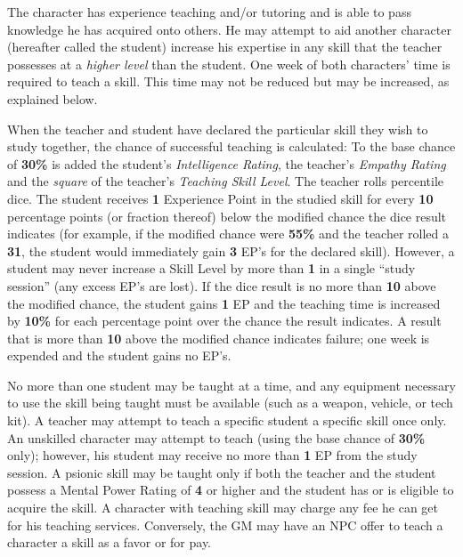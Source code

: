 \label{sec:skill-teaching}

The character has experience teaching and/or tutoring and is able to
pass knowledge he has acquired onto others.  He may attempt to aid
another character (hereafter called the student) increase his
expertise in any skill that the teacher possesses at a \emph{higher level}
than the student.  One week of both characters' time is required to
teach a skill.  This time may not be reduced but may be increased, as
explained below.

When the teacher and student have declared the particular skill they
wish to study together, the chance of successful teaching is
calculated: To the base chance of \textbf{30\%} is added the student's
\emph{Intelligence Rating}, the teacher's \emph{Empathy Rating} and
the \emph{square} of the teacher's \emph{Teaching Skill Level}.  The
teacher rolls percentile dice.  The student receives \textbf{1}
Experience Point in the studied skill for every \textbf{10} percentage
points (or fraction thereof) below the modified chance the dice result
indicates (for example, if the modified chance were \textbf{55\%} and
the teacher rolled a \textbf{31}, the student would immediately gain
\textbf{3} EP's for the declared skill).  However, a student may never
increase a Skill Level by more than \textbf{1} in a single ``study
session'' (any excess EP's are lost).  If the dice result is no more
than \textbf{10} above the modified chance, the student gains
\textbf{1} EP and the teaching time is increased by \textbf{10\%} for
each percentage point over the chance the result indicates.  A result
that is more than \textbf{10} above the modified chance indicates
failure; one week is expended and the student gains no EP's.

No more than one student may be taught at a time, and any equipment
necessary to use the skill being taught must be available (such as a
weapon, vehicle, or tech kit).  A teacher may attempt to teach a
specific student a specific skill once only.  An unskilled character
may attempt to teach (using the base chance of \textbf{30\%} only);
however, his student may receive no more than \textbf{1} EP from the
study session.  A psionic skill may be taught only if both the teacher
and the student possess a Mental Power Rating of \textbf{4} or higher
and the student has or is eligible to acquire the skill.  A character
with teaching skill may charge any fee he can get for his teaching
services.  Conversely, the GM may have an NPC offer to teach a
character a skill as a favor or for pay.

